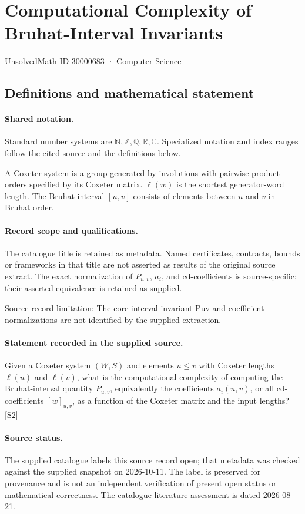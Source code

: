 \documentclass[11pt]{article}
\newcommand{\sref}[2]{\hyperlink{source:#1:#2}{[S#2]}}
\begin{document}
\setcounter{section}{30000682}
\section{Computational Complexity of Bruhat-Interval Invariants}\label{30000683}
{\small\sffamily UnsolvedMath ID 30000683 · Computer Science}
\subsection{Definitions and mathematical statement}

\paragraph{Shared notation.}Standard number systems are $\mathbb N,\mathbb Z,\mathbb Q,\mathbb R,\mathbb C$. Specialized notation and index ranges follow the cited source and the definitions below.


A Coxeter system is a group generated by involutions with pairwise product orders specified by its Coxeter matrix. $\ell(w)$ is the shortest generator-word length. The Bruhat interval $[u,v]$ consists of elements between $u$ and $v$ in Bruhat order.
\paragraph{Record scope and qualifications.}
The catalogue title is retained as metadata. Named certificates, contracts, bounds or frameworks in that title are not asserted as results of the original source extract.
The exact normalization of $P_{u,v}$, $a_i$, and cd-coefficients is source-specific; their asserted equivalence is retained as supplied.

Source-record limitation: The core interval invariant Puv and coefficient normalizations are not identified by the supplied extraction.
\paragraph{Statement recorded in the supplied source.}
Given a Coxeter system $(W,S)$ and elements $u\leq v$ with Coxeter lengths $\ell(u)$ and $\ell(v)$, what is the computational complexity of computing the Bruhat-interval quantity $P_{u,v}$, equivalently the coefficients $a_i(u,v)$, or all cd-coefficients $[w]_{u,v}$, as a function of the Coxeter matrix and the input lengths? \sref{30000683}{2}
\paragraph{Source status.}
The supplied catalogue labels this source record open; that metadata was checked against the supplied snapshot on 2026-10-11. The label is preserved for provenance and is not an independent verification of present open status or mathematical correctness. The catalogue literature assessment is dated 2026-08-21.
\end{document}
